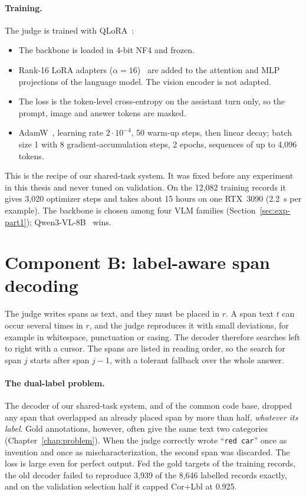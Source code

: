 \paragraph{Training.}
The judge is trained with QLoRA~\cite{dettmers2023qlora}:
\begin{itemize}
    \item The backbone is loaded in 4-bit NF4 and frozen.
    \item Rank-16 LoRA adapters ($\alpha = 16$)~\cite{hu2022lora} are added to the attention and MLP projections of the language model. The vision encoder is not adapted.
    \item The loss is the token-level cross-entropy on the assistant turn only, so the prompt, image and answer tokens are masked.
    \item AdamW~\cite{loshchilov2019adamw}, learning rate $2\cdot 10^{-4}$, 50 warm-up steps, then linear decay; batch size 1 with 8 gradient-accumulation steps, 2 epochs, sequences of up to 4,096 tokens.
\end{itemize}
This is the recipe of our shared-task system. It was fixed before any experiment in this thesis and never tuned on validation. On the 12,082 training records it gives 3,020 optimizer steps and takes about 15 hours on one RTX~3090 (2.2~s per example). The backbone is chosen among four VLM families (Section~\ref{sec:exp-part1}); Qwen3-VL-8B~\cite{bai2025qwen3} wins.

\section{Component B: label-aware span decoding}\label{sec:decoder}

The judge writes spans as text, and they must be placed in $r$. A span text $t$ can occur several times in $r$, and the judge reproduces it with small deviations, for example in whitespace, punctuation or casing. The decoder therefore searches left to right with a cursor. The spans are listed in reading order, so the search for span $j$ starts after span $j-1$, with a tolerant fallback over the whole answer.

\paragraph{The dual-label problem.}
The decoder of our shared-task system, and of the common code base, dropped any span that overlapped an already placed span by more than half, \emph{whatever its label}. Gold annotations, however, often give the same text two categories (Chapter~\ref{chap:problem}). When the judge correctly wrote ``\texttt{red car}'' once as invention and once as mischaracterization, the second span was discarded. The loss is large even for perfect output. Fed the gold targets of the training records, the old decoder failed to reproduce 3,939 of the 8,646 labelled records exactly, and on the validation selection half it capped Cor+Lbl at 0.925.

